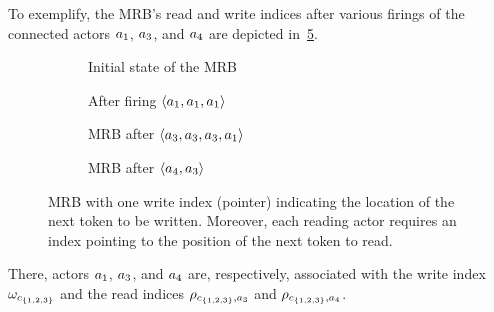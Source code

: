\par
To exemplify, the \ac{MRB}'s read and write indices after various firings of the connected actors $a_1$, $a_3$, and $a_4$ are depicted in~\cref{fig:stateOfMRB}.
\begin{figure}[t]
\centering
  \begin{subfigure}[b]{0.48\columnwidth}
   \centering
    \resizebox{\columnwidth}{!}{
    \begin{tikzpicture}
      \writingFIFOEmpty
    \end{tikzpicture}
    }
    \caption{\label{fig:MRBStateOne}Initial state of the \ac{MRB}}
  \end{subfigure}
  \begin{subfigure}[b]{0.48\columnwidth}
   \centering
    \resizebox{\columnwidth}{!}{
    \begin{tikzpicture}
      \writingFIFO
    \end{tikzpicture}
    }
    \caption{\label{fig:MRBStateTwo}After firing $\langle a_1, a_1, a_1 \rangle$}
  \end{subfigure}
  \begin{subfigure}[b]{0.48\columnwidth}
   \centering
    \resizebox{\columnwidth}{!}{
    \begin{tikzpicture}
      \writingFIFOSecond
    \end{tikzpicture}
    }
    \caption{\label{fig:MRBStateThree}\ac{MRB} after $\langle a_3, a_3, a_3, a_1 \rangle$}
  \end{subfigure}
  \begin{subfigure}[b]{0.48\columnwidth}
   \centering
    \resizebox{\columnwidth}{!}{
    \begin{tikzpicture}
      \writingFIFOThird
    \end{tikzpicture}
    }
    \caption{\label{fig:MRBStateFour}\ac{MRB} after $\langle a_4, a_3 \rangle$}
  \end{subfigure}
  \caption{\label{fig:stateOfMRB}\ac{MRB} with one write index (pointer) indicating the location of the next token to be written.
    Moreover, each reading actor requires an index pointing to the position of the next token to read.\vspace{-3mm}}
\end{figure}
There, actors $a_1$, $a_3$, and $a_4$ are, respectively, associated with the write index $\omega_{c_{\{1,2,3\}}}$ and the read indices $\rho_{c_{\{1,2,3\}},a_3}$ and $\rho_{c_{\{1,2,3\}},a_4}$.
